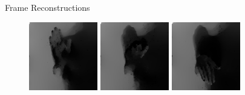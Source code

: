 \documentclass{beamer}
\begin{document}
\begin{frame}{Frame Reconstructions}
  \begin{figure}
    \centering
    \includegraphics[width=3cm]{figures/reconstructed-1}
    \hspace{0.7cm}
    \includegraphics[width=3cm]{figures/reconstructed-2}
    \hspace{0.7cm}
    \includegraphics[width=3cm]{figures/reconstructed-3}
  \end{figure}
\end{frame}
\end{document}
